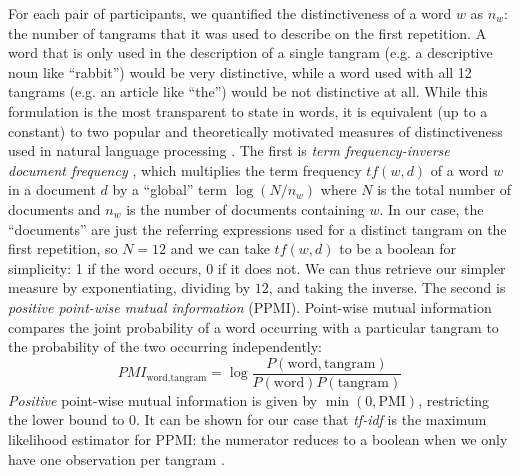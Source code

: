 \documentclass[alpha-refs]{wiley-article}
\begin{document}
For each pair of participants, we quantified the distinctiveness of a word $w$ as $n_w$: the number of tangrams that it was used to describe on the first repetition. 
A word that is only used in the description of a single tangram (e.g. a descriptive noun like ``rabbit'') would be very distinctive, while a word used with all 12 tangrams (e.g. an article like ``the'') would be not distinctive at all.
While this formulation is the most transparent to state in words, it is equivalent (up to a constant) to two popular  and theoretically motivated measures of distinctiveness used in natural language processing \citep{salton1988term}.
The first is \emph{term frequency-inverse document frequency} \citep[tf-idf,][]{sparck1972statistical}, which multiplies the term frequency $tf(w,d)$ of a word $w$ in a document $d$ by a ``global'' term $\log(N/n_w)$ where $N$ is the total number of documents and $n_w$ is the number of documents containing $w$. 
In our case, the ``documents'' are just the referring expressions used for a distinct tangram on the first repetition, so $N=12$ and we can take $tf(w,d)$ to be a boolean for simplicity: 1 if the word occurs, 0 if it does not.
We can thus retrieve our simpler measure by exponentiating, dividing by $12$, and taking the inverse.
The second is \emph{positive point-wise mutual information} (PPMI). 
Point-wise mutual information compares the joint probability of a word occurring with a particular tangram to the probability of the two occurring independently: 
$$PMI_{\textrm{word},\textrm{tangram}} = \log\frac{P(\textrm{word}, \textrm{tangram})}{P(\textrm{word})P(\textrm{tangram})}$$
\emph{Positive} point-wise mutual information is given by $\min(0, \textrm{PMI})$, restricting the lower bound to 0. 
It can be shown for our case that \emph{tf-idf} is the maximum likelihood estimator for PPMI: the numerator reduces to a boolean when we only have one observation per tangram \citep{robertson2004understanding}.
\end{document}
